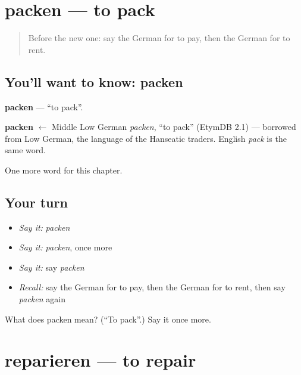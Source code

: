 \section[packen]{packen — to pack}

\label{lesson:GE-C141-packen}



\begin{quote}
Before the new one: say the German for to pay, then the German for to rent.
\end{quote}

\subsection*{You'll want to know: packen}
\textbf{packen} — \textquotedblleft{}to pack\textquotedblright{}.

\begin{cousinweb}
\textbf{packen} $\leftarrow$ Middle Low German \emph{packen}, \textquotedblleft{}to pack\textquotedblright{} (EtymDB 2.1) — borrowed from Low German, the language of the Hanseatic traders. English \emph{pack} is the same word.
\end{cousinweb}

\begin{grammarlens}[title={What you've built}]
One more word for this chapter.
\end{grammarlens}

\subsection*{Your turn}
\begin{itemize}
\raggedright
  \item \emph{Say it:} \emph{packen}
  \item \emph{Say it:} \emph{packen}, once more
  \item \emph{Say it:} say \emph{packen}
  \item \emph{Recall:} say the German for to pay, then the German for to rent, then say \emph{packen} again
\end{itemize}

\begin{tcolorbox}[breakable,colback=teal!4,colframe=teal!35!black,title={Before you move on}]
What does packen mean? (\textquotedblleft{}To pack\textquotedblright{}.) Say it once more.
\end{tcolorbox}
\section[reparieren]{reparieren — to repair}

